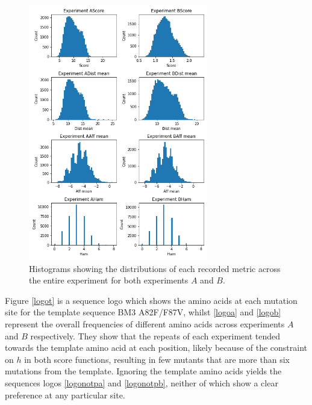 \documentclass[16pt]{book}
\begin{document}
\begin{figure}
	\begin{center}
		\includegraphics[width=0.7\textwidth]{img/exp-a-b-compr-dists.png}
		\caption{\label{abdistr} Histograms showing the distributions of each recorded metric across the entire experiment for both experiments $A$ and $B$.}
	\end{center}
\end{figure}

Figure \ref{logot} is a sequence logo which shows the amino acids at each mutation site for the template sequence BM3 A82F/F87V, whilst \ref{logoa} and \ref{logob} represent the overall frequencies of different amino acids across experiments $A$ and $B$ respectively.
They show that the repeats of each experiment tended towards the template amino acid at each position, likely because of the constraint on $h$ in both score functions, resulting in few mutants that are more than six mutations from the template.
Ignoring the template amino acids yields the sequences logos \ref{logonotpa} and \ref{logonotpb}, neither of which show a clear preference at any particular site.
\end{document}
